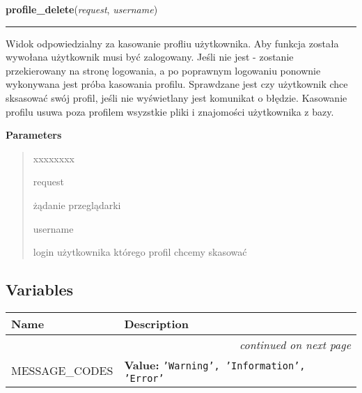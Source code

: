 \hspace{.8\funcindent}\begin{boxedminipage}{\funcwidth}

    \raggedright \textbf{profile\_delete}(\textit{request}, \textit{username})

    \vspace{-1.5ex}

    \rule{\textwidth}{0.5\fboxrule}
\setlength{\parskip}{2ex}
    Widok odpowiedzialny za kasowanie profliu użytkownika. Aby funkcja 
    została wywołana użytkownik musi być zalogowany. Jeśli nie jest - 
    zostanie przekierowany na stronę logowania, a po poprawnym logowaniu 
    ponownie wykonywana jest próba kasowania profilu. Sprawdzane jest czy 
    użytkownik chce sksasować swój profil, jeśli nie wyświetlany jest 
    komunikat o błędzie. Kasowanie profilu usuwa poza profilem wsyzstkie 
    pliki i znajomości użytkownika z bazy.

\setlength{\parskip}{1ex}
      \textbf{Parameters}
      \vspace{-1ex}

      \begin{quote}
        \begin{Ventry}{xxxxxxxx}

          \item[request]

          żądanie przeglądarki

          \item[username]

          login użytkownika którego profil chcemy skasować

        \end{Ventry}

      \end{quote}

    \end{boxedminipage}



  \subsection{Variables}

    \vspace{-1cm}
\hspace{\varindent}\begin{longtable}{|p{\varnamewidth}|p{\vardescrwidth}|l}
\cline{1-2}
\cline{1-2} \centering \textbf{Name} & \centering \textbf{Description}& \\
\cline{1-2}
\endhead\cline{1-2}\multicolumn{3}{r}{\small\textit{continued on next page}}\\\endfoot\cline{1-2}
\endlastfoot\raggedright M\-E\-S\-S\-A\-G\-E\-\_\-C\-O\-D\-E\-S\- & \raggedright \textbf{Value:} 
{\tt 'Warning', 'Information', 'Error'}&\\
\cline{1-2}
\end{longtable}


